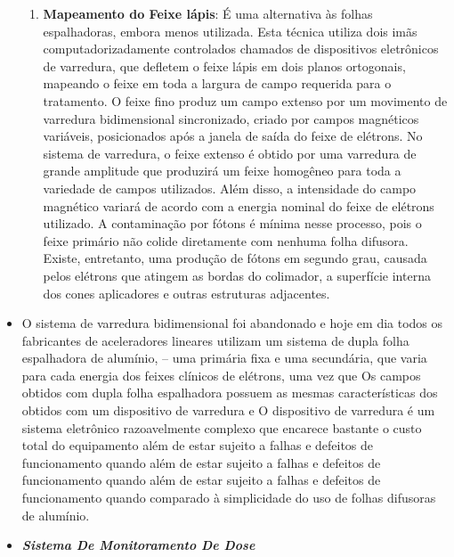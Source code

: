 \documentclass[11pt,a4paper]{article}
\begin{document}
\begin{itemize}
\begin{enumerate}
                                \item \textbf{Mapeamento do Feixe lápis}: É uma alternativa às folhas espalhadoras, embora menos utilizada. Esta técnica utiliza dois imãs computadorizadamente controlados chamados de dispositivos eletrônicos de varredura, que defletem o feixe lápis em dois planos ortogonais, mapeando o feixe em toda a largura de campo requerida para o tratamento.  O feixe fino produz um campo extenso por um movimento de varredura bidimensional sincronizado, criado por campos magnéticos variáveis, posicionados após a janela de saída do feixe de elétrons. No sistema de varredura, o feixe extenso é obtido por uma varredura de grande amplitude que produzirá um feixe homogêneo para toda a variedade de campos utilizados. Além disso, a intensidade do campo magnético variará de acordo com a energia nominal do feixe de elétrons utilizado. A contaminação por fótons é mínima nesse processo, pois o feixe primário não colide diretamente com nenhuma folha difusora. Existe, entretanto, uma produção de fótons em segundo grau, causada pelos elétrons que atingem as bordas do colimador, a superfície interna dos cones aplicadores e outras estruturas adjacentes.
                            \end{enumerate}

                        \item O sistema de varredura bidimensional foi abandonado e hoje em dia todos os fabricantes de aceleradores lineares utilizam um sistema de dupla folha espalhadora de alumínio, – uma primária fixa e uma secundária, que varia para cada energia dos feixes clínicos de elétrons, uma vez que Os campos obtidos com dupla folha espalhadora possuem as mesmas características dos obtidos com um dispositivo de varredura e O dispositivo de varredura é um sistema eletrônico razoavelmente complexo que encarece bastante o custo total do equipamento além de estar sujeito a falhas e defeitos de funcionamento quando além de estar sujeito a falhas e defeitos de funcionamento quando além de estar sujeito a falhas e defeitos de funcionamento quando comparado à simplicidade do uso de folhas difusoras de alumínio.
                        
                    \end{itemize}
                

                \begin{itemize}
                    \item \textbf{\textit{\textcolor{CarnationPink}{Sistema De Monitoramento De Dose}}}
                \end{itemize}
\end{document}
